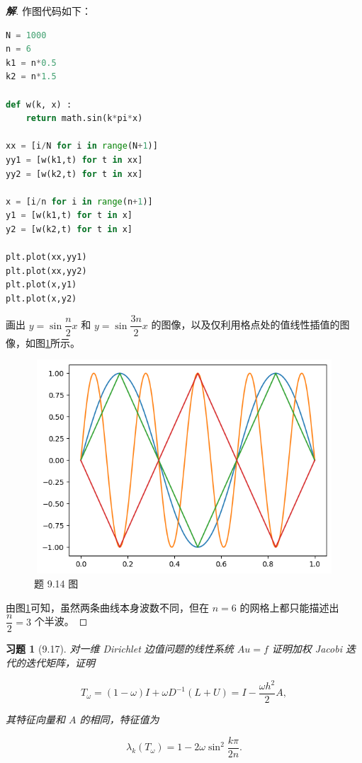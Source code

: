 \documentclass{ctexart}
\newtheorem{ex}{习题}
\newenvironment{sol}{\begin{proof}[\bf 解]}{\end{proof}}
\begin{document}
\begin{sol}

作图代码如下：

\begin{lstlisting}[language={python}]
N = 1000
n = 6
k1 = n*0.5
k2 = n*1.5

def w(k, x) :
    return math.sin(k*pi*x)

xx = [i/N for i in range(N+1)]
yy1 = [w(k1,t) for t in xx]
yy2 = [w(k2,t) for t in xx]

x = [i/n for i in range(n+1)]
y1 = [w(k1,t) for t in x]
y2 = [w(k2,t) for t in x]

plt.plot(xx,yy1)
plt.plot(xx,yy2)
plt.plot(x,y1)
plt.plot(x,y2)
\end{lstlisting}

画出 $y=\sin \dfrac n2 x$ 和 $y=\sin \dfrac {3n}2 x$ 的图像，以及仅利用格点处的值线性插值的图像，如图\ref{9.14-fig}所示。

\begin{figure}[h]
	\includegraphics[width = 12cm, height = 8cm]{14.png}
    \caption{题 9.14 图}
	\label{9.14-fig}
\end{figure}

由图\ref{9.14-fig}可知，虽然两条曲线本身波数不同，但在 $n=6$ 的网格上都只能描述出 $\dfrac n2=3$ 个半波。
\end{sol}

\begin{ex}[9.17]

对一维 Dirichlet 边值问题的线性系统 $Au=f$ 证明加权 Jacobi 迭代的迭代矩阵，证明

\begin{equation}
    T_\omega = (1-\omega)I + \omega D^{-1}(L+U) = I - \dfrac {\omega h^2}2 A,
\end{equation}

其特征向量和 $A$ 的相同，特征值为

\begin{equation}
    \lambda_k(T_\omega) = 1 - 2\omega \sin^2 \dfrac {k\pi}{2n}.
\end{equation}

\end{ex}
\end{document}
